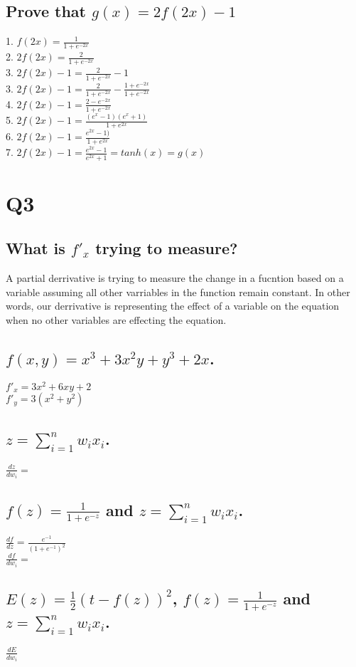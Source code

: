 \documentclass[11pt]{article}
\begin{document}
\subsection{Prove that $g(x) = 2f(2x)-1$}
1. $f(2x) = \frac{1}{1+e^{-2x}}$ \\
2. $2f(2x) =\frac{2}{1+e^{-2x}}$ \\
3. $2f(2x) - 1 = \frac{2}{1+e^{-2x}}  -1$ \\
3. $2f(2x) - 1 = \frac{2}{1+e^{-2x}}  - \frac{1+e^{-2x}}{1+e^{-2x}}$ \\
4. $2f(2x) - 1 = \frac{2- e^{-2x}}{1+e^{-2x}}$ \\
5. $2f(2x) - 1 = \frac{(e^{x}-1)(e^{x}+1)}{1+e^{2x}}$ \\
6. $2f(2x) - 1 = \frac{e^{2x}-1)}{1+e^{2x}}$ \\
7.  $2f(2x) - 1  = \frac{e^{2x}-1}{e^{2x}+1} = tanh(x) = g(x)$  \\
\section{Q3}   
\subsection{What is $f'_x$ trying to measure?}
A partial derrivative is trying to measure the change in a fucntion based on a variable assuming all other varriables in the function remain constant. In other words, our derrivative is representing the effect of a variable on the equation when no other variables are effecting the equation.
\subsection{$f(x,y)=x^3 + 3x^2y+y^3 + 2x$.}
$f'_x = 3x^2 + 6xy+2 $  \\ $f'_y = 3(x^2+y^2)$
\subsection{ $z = \sum_{i=1}^n w_i x_i$.}
$\frac{dz}{dw_i}=$ \\
\subsection{$f(z)=\frac{1}{1+e^{-z}}$ and $z = \sum_{i=1}^n w_i x_i$.}
$\frac{df}{dz}= \frac{e^{-1}}{(1+e^{-1})^2}$ \\ 
$\frac{df}{dw_i}=$ \\
\subsection{$E(z)=\frac{1}{2}(t - f(z))^2$, $f(z)=\frac{1}{1+e^{-z}}$ and $z = \sum_{i=1}^n w_i x_i$.}
$\frac{dE}{dw_i}$
\end{document}
